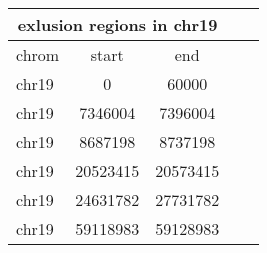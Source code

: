 \documentclass{standalone}
\begin{document}
\begin{tabular}{|l|c|c|c|c|}
\hline
\multicolumn{3}{|c|}{\textbf{exlusion regions in chr19}}\\
\hline 

chrom & start & end \\
\hline
chr19 & 0 & 60000 \\
chr19 & 7346004 & 7396004 \\
chr19 & 8687198 & 8737198 \\
chr19 & 20523415 & 20573415 \\
chr19 & 24631782 & 27731782 \\
chr19 & 59118983 & 59128983 \\
\hline
\end{tabular}
\end{document}
